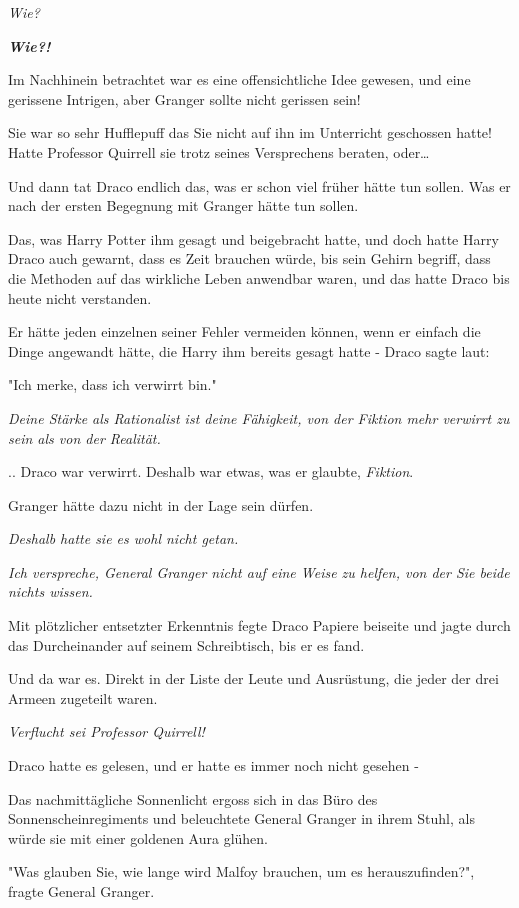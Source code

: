 {\emph{Wie?}

\textbf{\emph{Wie?!}}

Im Nachhinein betrachtet war es eine offensichtliche Idee gewesen, und eine gerissene Intrigen, aber Granger sollte nicht gerissen sein!

Sie war so sehr Hufflepuff das Sie nicht auf ihn im Unterricht geschossen hatte! Hatte Professor Quirrell sie trotz seines Versprechens beraten, oder…

Und dann tat Draco endlich das, was er schon viel früher hätte tun sollen. Was er nach der ersten Begegnung mit Granger hätte tun sollen.

Das, was Harry Potter ihm gesagt und beigebracht hatte, und doch hatte Harry Draco auch gewarnt, dass es Zeit brauchen würde, bis sein Gehirn begriff, dass die Methoden auf das wirkliche Leben anwendbar waren, und das hatte Draco bis heute nicht verstanden.

Er hätte jeden einzelnen seiner Fehler vermeiden können, wenn er einfach die Dinge angewandt hätte, die Harry ihm bereits gesagt hatte - Draco sagte laut:

"Ich merke, dass ich verwirrt bin."

\emph{Deine Stärke als Rationalist ist deine Fähigkeit, von der Fiktion mehr verwirrt zu sein als von der Realität.}

.. Draco war verwirrt. Deshalb war etwas, was er glaubte, \emph{Fiktion}.

Granger hätte dazu nicht in der Lage sein dürfen.

\emph{Deshalb hatte sie es wohl nicht getan.}

\emph{Ich verspreche, General Granger nicht auf eine Weise zu helfen, von der Sie beide nichts wissen.}

Mit plötzlicher entsetzter Erkenntnis fegte Draco Papiere beiseite und jagte durch das Durcheinander auf seinem Schreibtisch, bis er es fand.

Und da war es. Direkt in der Liste der Leute und Ausrüstung, die jeder der drei Armeen zugeteilt waren.

\emph{Verflucht sei Professor Quirrell!}

Draco hatte es gelesen, und er hatte es immer noch nicht gesehen -

Das nachmittägliche Sonnenlicht ergoss sich in das Büro des Sonnenscheinregiments und beleuchtete General Granger in ihrem Stuhl, als würde sie mit einer goldenen Aura glühen.

"Was glauben Sie, wie lange wird Malfoy brauchen, um es herauszufinden?", fragte General Granger.

}
